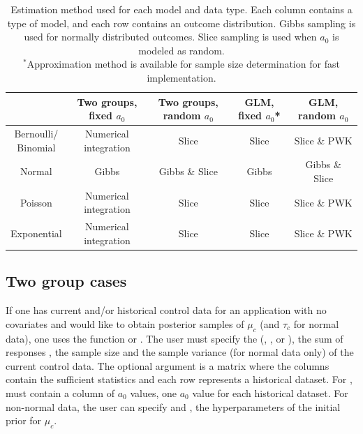 \begin{table}[t!]
\centering
\setlength{\extrarowheight}{5pt}
\begin{tabular}{ccccc}\toprule
 & \thead{Two groups,\\ fixed $a_0$} & \thead{Two groups,\\ random $a_0$} & \thead{GLM,\\ fixed $a_0$*} & \thead{GLM,\\ random $a_0$}\\[8pt]
\midrule
\thead{Bernoulli/\\Binomial} & \thead{Numerical\\ integration} & Slice & Slice & Slice \& PWK \\ 
Normal & Gibbs & Gibbs \& Slice  & Gibbs & Gibbs \& Slice\\
Poisson & \thead{Numerical\\ integration} & Slice & Slice &Slice \& PWK \\
Exponential & \thead{Numerical\\ integration} & Slice  & Slice & Slice \& PWK\\\bottomrule
\end{tabular}
\caption{Estimation method used for each model and data type. Each column contains a type of model, and each row contains an outcome distribution. Gibbs sampling is used for normally distributed outcomes. Slice sampling is used when $a_0$ is modeled as random. \\ $^*$Approximation method is available for sample size determination for fast implementation.}
\label{table:methods}
\end{table}


\subsection*{Two group cases}

If one has current and/or historical control data for an application with no covariates and would like to obtain posterior samples of $\mu_c$ (and $\tau_c$ for normal data), one uses the function  or . The user must specify the  (, ,  or ), the sum of responses , the sample size  and the sample variance  (for normal data only) of the current control data. The optional  argument is a matrix where the columns contain the sufficient statistics and each row represents a historical dataset. For ,  must contain a column of $a_0$ values, one $a_0$ value for each historical dataset. For non-normal data, the user can specify  and , the hyperparameters of the initial prior for $\mu_c$. 

